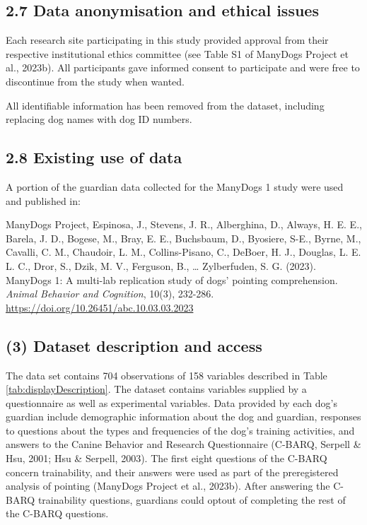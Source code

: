 \documentclass[
  pub,floatsintext]{apa6}
\begin{document}
\hypertarget{data-anonymisation-and-ethical-issues}{%
\subsection{2.7 Data anonymisation and ethical issues}\label{data-anonymisation-and-ethical-issues}}

Each research site participating in this study provided approval from their respective institutional ethics committee (see Table S1 of ManyDogs Project et al., 2023b). All participants gave informed consent to participate and were free to discontinue from the study when wanted.

All identifiable information has been removed from the dataset, including replacing dog names with dog ID numbers.

\hypertarget{existing-use-of-data}{%
\subsection{2.8 Existing use of data}\label{existing-use-of-data}}

A portion of the guardian data collected for the ManyDogs 1 study were used and published in:

ManyDogs Project, Espinosa, J., Stevens, J. R., Alberghina, D., Always, H. E. E., Barela, J. D., Bogese, M., Bray, E. E., Buchsbaum, D., Byosiere, S-E., Byrne, M., Cavalli, C. M., Chaudoir, L. M., Collins-Pisano, C., DeBoer, H. J., Douglas, L. E. L. C., Dror, S., Dzik, M. V., Ferguson, B., \ldots{} Zylberfuden, S. G. (2023). ManyDogs 1: A multi-lab replication study of dogs' pointing comprehension. \emph{Animal Behavior and Cognition}, 10(3), 232-286.
\url{https://doi.org/10.26451/abc.10.03.03.2023}

\hypertarget{dataset-description-and-access}{%
\subsection{(3) Dataset description and access}\label{dataset-description-and-access}}

The data set contains 704 observations of 158 variables described in Table \ref{tab:displayDescription}. The dataset contains variables supplied by a questionnaire as well as experimental variables. Data provided by each dog's guardian include demographic information about the dog and guardian, responses to questions about the types and frequencies of the dog's training activities, and answers to the Canine Behavior and Research Questionnaire (C-BARQ, Serpell \& Hsu, 2001; Hsu \& Serpell, 2003). The first eight questions of the C-BARQ concern trainability, and their answers were used as part of the preregistered analysis of pointing (ManyDogs Project et al., 2023b). After answering the C-BARQ trainability questions, guardians could optout of completing the rest of the C-BARQ questions.
\end{document}
